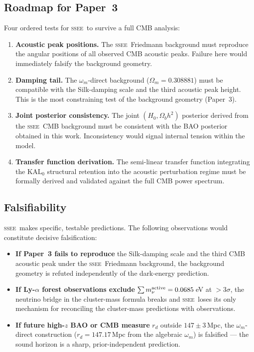 \documentclass[12pt,a4paper]{article}
\newcommand{\SSEE}{\ifmmode\mathrm{SSEE}\else\textsc{ssee}\fi}
\newcommand{\KALz}{\mathrm{KAL}_0}
\begin{document}
\subsection{Roadmap for Paper~3}

Four ordered tests for \SSEE\ to survive a full CMB analysis:
\begin{enumerate}
  \item \textbf{Acoustic peak positions.} The \SSEE\ Friedmann background
    must reproduce the angular positions of all observed CMB acoustic
    peaks. Failure here would immediately falsify the background geometry.
  \item \textbf{Damping tail.} The $\omega_m$-direct background
    ($\Omega_m=0.308881$) must be compatible with the Silk-damping scale \citep{Silk1968}
    and the third acoustic peak height. This is the most constraining test
    of the background geometry (Paper~3).
  \item \textbf{Joint posterior consistency.} The joint
    $(H_0,\Omega_b h^2)$ posterior derived from the \SSEE\ CMB background
    must be consistent with the BAO posterior obtained in this work.
    Inconsistency would signal internal tension within the model.
  \item \textbf{Transfer function derivation.} The semi-linear transfer
    function integrating the $\KALz$ structural retention into the
    acoustic perturbation regime must be formally derived and validated
    against the full CMB power spectrum.
\end{enumerate}

\subsection{Falsifiability}

\SSEE\ makes specific, testable predictions. The following observations
would constitute decisive falsification:
\begin{itemize}
  \item \textbf{If Paper~3 fails to reproduce} the Silk-damping scale
    and the third CMB acoustic peak under the \SSEE\ Friedmann
    background, the background geometry is refuted independently of
    the dark-energy prediction.
  \item \textbf{If Ly-$\alpha$ forest observations exclude}
    $\sum m_\nu^{\rm active}=0.0685$\,eV at $>3\sigma$, the neutrino bridge in the
    cluster-mass formula breaks and \SSEE\ loses its only mechanism
    for reconciling the cluster-mass predictions with observations.
  \item \textbf{If future high-$z$ BAO or CMB measure} $r_d$ outside
    $147\pm3$\,Mpc, the $\omega_m$-direct construction
    ($r_d=147.17$\,Mpc from the algebraic $\omega_m$) is falsified ---
    the sound horizon is a sharp, prior-independent prediction.
\end{itemize}
\end{document}
